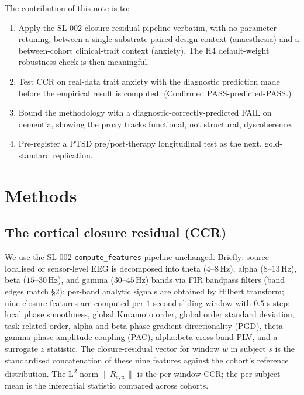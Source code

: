 \documentclass[11pt,a4paper]{article}
\begin{document}
\bigskip
\noindent{}
\bigskip

The contribution of this note is to:
\begin{enumerate}\itemsep0pt
\item Apply the SL-002 closure-residual pipeline verbatim, with no parameter retuning, between a single-substrate paired-design context (anaesthesia) and a between-cohort clinical-trait context (anxiety). The H4 default-weight robustness check is then meaningful.
\item Test CCR on real-data trait anxiety with the diagnostic prediction made before the empirical result is computed. (Confirmed PASS-predicted-PASS.)
\item Bound the methodology with a diagnostic-correctly-predicted FAIL on dementia, showing the proxy tracks functional, not structural, dyscoherence.
\item Pre-register a PTSD pre/post-therapy longitudinal test as the next, gold-standard replication.
\end{enumerate}

\section{Methods}\label{sec:methods}

\subsection{The cortical closure residual (CCR)}\label{sec:methods-ccr}

We use the SL-002 \texttt{compute\_features} pipeline \citep{SolutionLab002} unchanged. Briefly: source-localised or sensor-level EEG is decomposed into theta ($4$--$8$\,Hz), alpha ($8$--$13$\,Hz), beta ($15$--$30$\,Hz), and gamma ($30$--$45$\,Hz) bands via FIR bandpass filters (band edges match \citep{SolutionLab002} \S 2); per-band analytic signals are obtained by Hilbert transform; nine closure features are computed per $1$-second sliding window with $0.5$-s step: local phase smoothness, global Kuramoto order, global order standard deviation, task-related order, alpha and beta phase-gradient directionality (PGD), theta-gamma phase-amplitude coupling (PAC), alpha:beta cross-band PLV, and a surrogate $z$ statistic. The closure-residual vector for window $w$ in subject $s$ is the standardised concatenation of these nine features against the cohort's reference distribution. The L\textsuperscript{2}-norm $\|R_{s,w}\|$ is the per-window CCR; the per-subject mean is the inferential statistic compared across cohorts.
\end{document}
